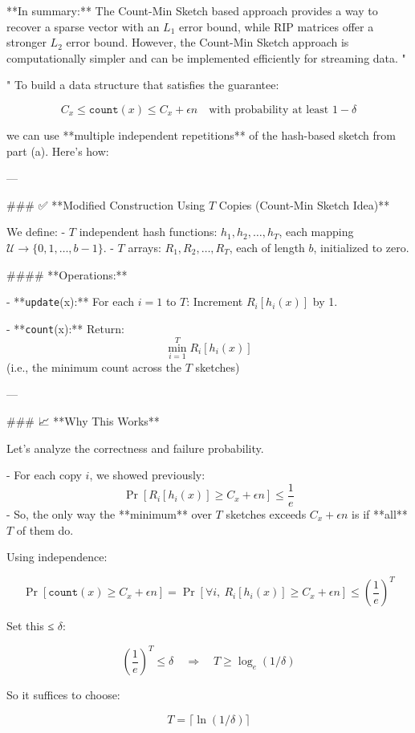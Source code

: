 \begin{enumerate}
\begin{shaded}
**In summary:** The Count-Min Sketch based approach provides a way to recover a sparse vector with an $L_1$ error bound, while RIP matrices offer a stronger $L_2$ error bound. However, the Count-Min Sketch approach is computationally simpler and can be implemented efficiently for streaming data.
"

"
To build a data structure that satisfies the guarantee:

\[
C_x \le \texttt{count}(x) \le C_x + \epsilon n \quad \text{with probability at least } 1 - \delta
\]

we can use **multiple independent repetitions** of the hash-based sketch from part (a). Here's how:

---

### ✅ **Modified Construction Using \( T \) Copies (Count-Min Sketch Idea)**

We define:
- \( T \) independent hash functions: \( h_1, h_2, \dots, h_T \), each mapping \( \mathcal{U} \to \{0, 1, \dots, b-1\} \).
- \( T \) arrays: \( R_1, R_2, \dots, R_T \), each of length \( b \), initialized to zero.

#### **Operations:**

- **\texttt{update}(x):**  
  For each \( i = 1 \) to \( T \):  
  Increment \( R_i[h_i(x)] \) by 1.

- **\texttt{count}(x):**  
  Return:
  \[
  \min_{i=1}^T R_i[h_i(x)]
  \]
  (i.e., the minimum count across the \( T \) sketches)

---

### 📈 **Why This Works**

Let's analyze the correctness and failure probability.

- For each copy \( i \), we showed previously:
  \[
  \Pr\left[R_i[h_i(x)] \geq C_x + \epsilon n\right] \leq \frac{1}{e}
  \]
- So, the only way the **minimum** over \( T \) sketches exceeds \( C_x + \epsilon n \) is if **all** \( T \) of them do.

Using independence:

\[
\Pr\left[\texttt{count}(x) \geq C_x + \epsilon n\right] = \Pr\left[\forall i, \ R_i[h_i(x)] \geq C_x + \epsilon n\right] \leq \left(\frac{1}{e}\right)^T
\]

Set this ≤ \( \delta \):

\[
\left(\frac{1}{e}\right)^T \leq \delta \quad \Rightarrow \quad T \geq \log_e(1/\delta)
\]

So it suffices to choose:

\[
T = \lceil \ln(1/\delta) \rceil
\]


\end{shaded}
\end{enumerate}
